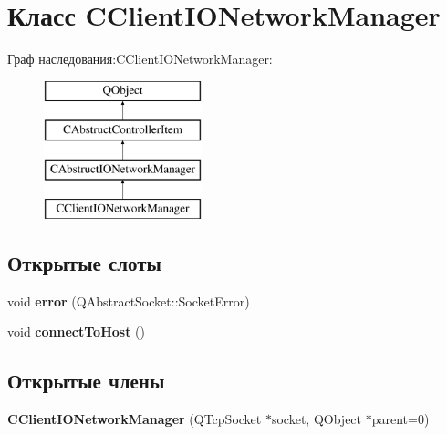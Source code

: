 \hypertarget{class_c_client_i_o_network_manager}{}\section{Класс C\+Client\+I\+O\+Network\+Manager}
\label{class_c_client_i_o_network_manager}
Граф наследования\+:C\+Client\+I\+O\+Network\+Manager\+:\begin{figure}[H]
\begin{center}
\leavevmode
\includegraphics[height=4.000000cm]{class_c_client_i_o_network_manager}
\end{center}
\end{figure}
\subsection*{Открытые слоты}
\begin{DoxyCompactItemize}
\item 
\hypertarget{class_c_client_i_o_network_manager_a1a4c3fd9405b85cb43e20b24d9db18e8}{}\label{class_c_client_i_o_network_manager_a1a4c3fd9405b85cb43e20b24d9db18e8} 
void {\bfseries error} (Q\+Abstract\+Socket\+::\+Socket\+Error)
\item 
\hypertarget{class_c_client_i_o_network_manager_aaa7b77037603697d3bee7daed467b092}{}\label{class_c_client_i_o_network_manager_aaa7b77037603697d3bee7daed467b092} 
void {\bfseries connect\+To\+Host} ()
\end{DoxyCompactItemize}
\subsection*{Открытые члены}
\begin{DoxyCompactItemize}
\item 
\hypertarget{class_c_client_i_o_network_manager_af9f85db2c4a515cc974038086edc6b9f}{}\label{class_c_client_i_o_network_manager_af9f85db2c4a515cc974038086edc6b9f} 
{\bfseries C\+Client\+I\+O\+Network\+Manager} (Q\+Tcp\+Socket $\ast$socket, Q\+Object $\ast$parent=0)
\end{DoxyCompactItemize}
